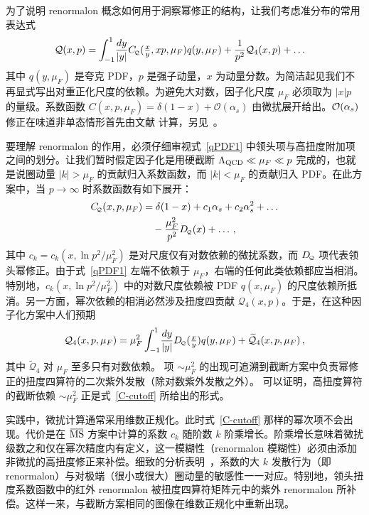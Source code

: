 为了说明 renormalon 概念如何用于洞察幂修正的结构，让我们考虑准分布的常用表达式~\cite{Ji:2015qla,Izubuchi:2018srq}
\begin{align}
\label{qPDF1}
 \mathcal{Q}(x,p) &= \int_{-1}^1 \!\frac{dy}{|y|} C_{\!\scriptscriptstyle \mathcal{Q}}(\tfrac{x}{y},xp,\mu_F) q(y,\mu_F) + \frac{1}{p^2}  \mathcal{Q}_4(x,p) + \ldots
\end{align}
其中 $q(y,\mu_F)$ 是夸克 PDF，$p$ 是强子动量，$x$ 为动量分数。为简洁起见我们不再显式写出对重正化尺度的依赖。为避免大对数，因子化尺度 $\mu_F$ 必须取为 $|x| p$ 的量级。系数函数 $C(x,p,\mu_F) = \delta(1-x) + \mathcal{O}(\alpha_s)$ 由微扰展开给出。${\cal O}(\alpha_s)$ 修正在味道非单态情形首先由文献 \cite{Xiong:2013bka} 计算，另见~\cite{Stewart:2017tvs}。

要理解 renormalon 的作用，必须仔细审视式~\eqref{qPDF1} 中领头项与高扭度附加项之间的划分。让我们暂时假定因子化是用硬截断 $\Lambda_{\rm QCD} \ll \mu_F  \ll p$ 完成的，也就是说圈动量 $|k| > \mu_F$ 的贡献归入系数函数，而 $|k| < \mu_F$ 的贡献归入 PDF。在此方案中，当 $p\to\infty$ 时系数函数有如下展开：
\begin{align}
\label{C-cutoff}
 C_{\!\scriptscriptstyle \mathcal{Q}}(x,p,\mu_F) &= \delta(1-x) + c_1 \alpha_s + c_2\alpha_s^2 + \ldots
\notag\\ &\quad{}
- \frac{\mu_F^2}{p^2} D_{\!\scriptscriptstyle \mathcal{Q}}(x) +\ldots\,,
\end{align}
其中 $c_k= c_k(x,\ln p^2/\mu_F^2)$ 是对尺度仅有对数依赖的微扰系数，而 $D_{\!\scriptscriptstyle \mathcal{Q}}$ 项代表领头幂修正。由于式~\eqref{qPDF1} 左端不依赖于 $\mu_F$，右端的任何此类依赖都应当相消。特别地，$c_k(x,\ln p^2/\mu_F^2)$ 中的对数尺度依赖被 PDF $q(x,\mu_F)$ 的尺度依赖所抵消。另一方面，幂次依赖的相消必然涉及扭度四贡献 $\mathcal{Q}_4(x,p)$。于是，在这种因子化方案中人们预期
\begin{align}
\label{Q4-cutoff}
 \mathcal{Q}_4(x,p,\mu_F) = \mu_F^2 \int_{-1}^1 \!\frac{dy}{|y|} D_{\!\scriptscriptstyle \mathcal{Q}}(\tfrac{x}{y}) q(y,\mu_F) + \widetilde{\mathcal{Q}}_4(x,p,\mu_F)\,,
\end{align}
其中 $\widetilde{\mathcal{Q}}_4$ 对 $\mu_F$ 至多只有对数依赖。
项 $\sim \mu_F^2$ 的出现可追溯到截断方案中负责幂修正的扭度四算符的二次紫外发散（除对数紫外发散之外）。
可以证明，高扭度算符的截断依赖 $\sim \mu_F^2$ 正是式~\eqref{C-cutoff} 所给出的形式。

实践中，微扰计算通常采用维数正规化。此时式~\eqref{C-cutoff} 那样的幂次项不会出现。代价是在 $\MSbar$ 方案中计算的系数 $c_k$ 随阶数 $k$ 阶乘增长。阶乘增长意味着微扰级数之和仅在幂次精度内有定义，这一模糊性（renormalon 模糊性）必须由添加非微扰的高扭度修正来补偿。细致的分析表明~\cite{Beneke:1998ui,Beneke:2000kc}，系数的大 $k$ 发散行为（即 renormalon）与对极端（很小或很大）圈动量的敏感性一一对应。特别地，领头扭度系数函数中的红外 renormalon 被扭度四算符矩阵元中的紫外 renormalon 所补偿。这样一来，与截断方案相同的图像在维数正规化中重新出现。

